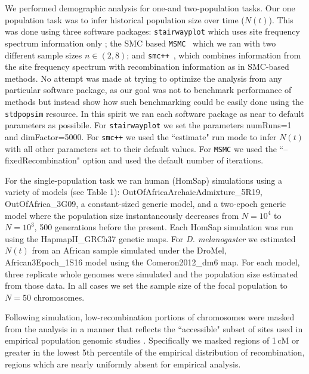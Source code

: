 \documentclass[12pt,halfline,a4paper]{ouparticle}
\newcommand{\stdpopsim}{\texttt{stdpopsim}\xspace}
\newcommand{\MSMC}{\texttt{MSMC}\xspace}
\newcommand{\smcpp}{\texttt{smc++}\xspace}
\newcommand{\stairwayplot}{\texttt{stairwayplot}\xspace}
\begin{document}
We performed demographic analysis for one-and two-population tasks.
Our one population task was to infer historical population size over
time ($N(t)$). This was done using three software packages: \stairwayplot
which uses site frequency spectrum information only \citep{liu2015exploring};
the SMC based \MSMC~\citep{schiffels2014inferring} which we ran with two different
sample sizes $n\in (2 , 8)$; and \smcpp~\citep{terhorst2017robust},
which combines information from the site frequency spectrum with
recombination information as in SMC-based methods. No attempt
was made at trying to optimize the analysis from
any particular software package,
as our goal was not to benchmark performance of methods but
instead show how such benchmarking could be easily done using
the \stdpopsim resource. In this spirit we ran each software package as near
to default parameters as possibile. For \stairwayplot we
set the parameters numRuns=1 and dimFactor=5000. For \smcpp we used the
``estimate" run mode to infer $N(t)$ with all other parameters set
to their default values. For \MSMC we used the ``--fixedRecombination"
option and used the default number of iterations.

For the single-population task we ran human (HomSap) simulations
using a variety of models (see Table 1): OutOfAfricaArchaicAdmixture\_5R19, OutOfAfrica\_3G09,
a constant-sized generic model, and a two-epoch generic model where the
population size instantaneously decreases from $N=10^4$ to $N=10^3$, 500
generations before the present. Each HomSap simulation was run
using the HapmapII\_GRCh37 genetic maps. For \emph{D. melanogaster}
we estimated $N(t)$ from an African sample simulated under the DroMel,
African3Epoch\_1S16 model using the Comeron2012\_dm6 map.
For each model, three replicate whole genomes were
simulated and the population size estimated from those data. In all cases we
set the sample size of the focal population to $N=50$ chromosomes.

Following simulation, low-recombination portions of chromosomes were masked
from the analysis in a manner that reflects the ``accessible" subset of sites
used in empirical population genomic studies \citep[e.g.,][]{danecek20111000,langley2012genomic}.
Specifically we masked regions of 1\,cM or greater in the lowest 5th percentile of the empirical
distribution of recombination, regions which are nearly uniformly absent for
empirical analysis.
\end{document}
